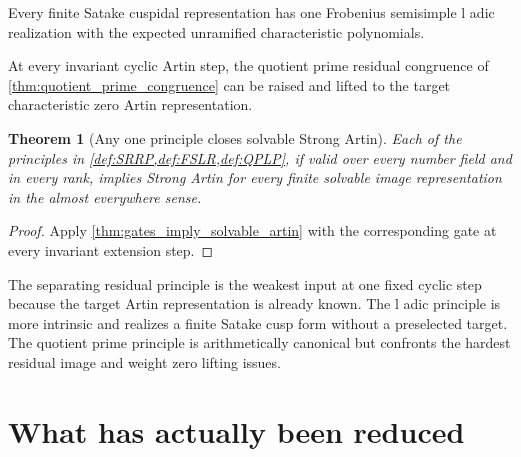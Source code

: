 \documentclass{aomart}
\newtheorem{theorem}{Theorem}[section]
\theoremstyle{definition}
\theoremstyle{remark}
\begin{document}
\begin{definition}\label{def:FSLR}
Every finite Satake cuspidal representation has one Frobenius semisimple l adic realization with the expected unramified characteristic polynomials.
\end{definition}

\begin{definition}\label{def:QPLP}
At every invariant cyclic Artin step, the quotient prime residual congruence of \cref{thm:quotient_prime_congruence} can be raised and lifted to the target characteristic zero Artin representation.
\end{definition}

\begin{theorem}[Any one principle closes solvable Strong Artin]\label{thm:any_principle_closes}
Each of the principles in \cref{def:SRRP,def:FSLR,def:QPLP}, if valid over every number field and in every rank, implies Strong Artin for every finite solvable image representation in the almost everywhere sense.
\end{theorem}

\begin{proof}
Apply \cref{thm:gates_imply_solvable_artin} with the corresponding gate at every invariant extension step.
\end{proof}

\begin{remark}\label{rem:three_target_scope}
The separating residual principle is the weakest input at one fixed cyclic step because the target Artin representation is already known. The l adic principle is more intrinsic and realizes a finite Satake cusp form without a preselected target. The quotient prime principle is arithmetically canonical but confronts the hardest residual image and weight zero lifting issues.
\end{remark}

\section{What has actually been reduced}\label{sec:reduction_ledger}
\end{document}
